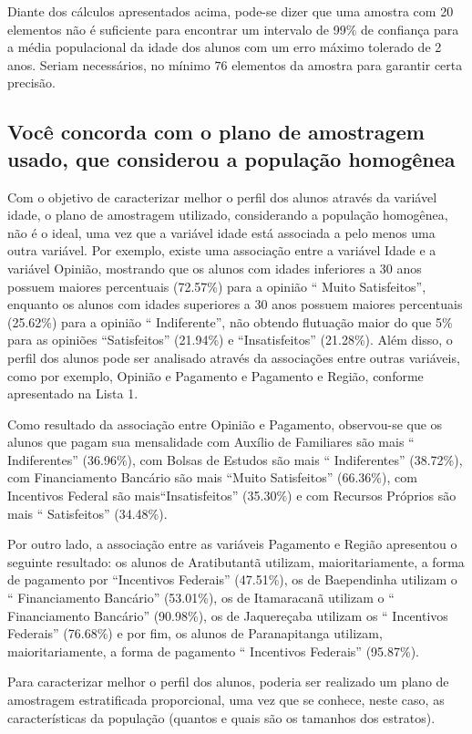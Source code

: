 	Diante dos cálculos apresentados acima, pode-se dizer que uma amostra
	com 20 elementos não é suficiente para encontrar um intervalo de 99\% de
	confiança para a média populacional da idade dos alunos com um erro
	máximo tolerado de 2 anos. Seriam necessários, no mínimo $76$ elementos da
	amostra para garantir certa precisão. 

\subsection{Você concorda com o plano de amostragem usado, que considerou a população homogênea}
	
	Com o objetivo de caracterizar melhor o perfil dos alunos através da
	variável idade, o plano de amostragem utilizado, considerando a
	população homogênea, não é o ideal, uma vez que a variável idade está
	associada a pelo menos uma outra variável. Por exemplo, existe uma
	associação entre a variável Idade e a variável Opinião, mostrando que os
	alunos com idades inferiores a 30 anos possuem maiores percentuais
	(\num{72,57}\%) para a opinião `` Muito Satisfeitos'', enquanto os 
    alunos com idades superiores
	a 30 anos possuem maiores percentuais (\num{25,62}\%) para a opinião
    `` Indiferente'', não obtendo flutuação
	maior do que 5\% para as opiniões ``Satisfeitos'' (\num{21,94}\%) 
    e ``Insatisfeitos'' (\num{21,28}\%). Além disso, o perfil dos
	alunos pode ser analisado através da associações entre outras variáveis,
	como por exemplo, Opinião e Pagamento e Pagamento e Região, conforme
	apresentado na Lista 1. 

	Como resultado da associação entre Opinião e Pagamento, observou-se que
	os alunos que pagam sua mensalidade com Auxílio de Familiares são mais
	`` Indiferentes'' (\num{36,96}\%), com Bolsas
	de Estudos são mais `` Indiferentes''
	(\num{38,72}\%), com Financiamento Bancário são mais ``Muito Satisfeitos''
    (\num{66,36}\%), com Incentivos Federal são mais``Insatisfeitos'' (\num{35,30}\%) e com
	Recursos Próprios são mais ``
	Satisfeitos'' (\num{34,48}\%).

	Por outro lado, a associação entre as variáveis Pagamento e Região
	apresentou o seguinte resultado: os alunos de Aratibutantã utilizam,
	maioritariamente, a forma de pagamento por ``Incentivos Federais''
    (\num{47,51}\%), os de Baependinha utilizam o
	`` Financiamento Bancário'' (\num{53,01}\%), os
	de Itamaracanã utilizam o `` Financiamento Bancário'' 
    (\num{90,98}\%), os de Jaquereçaba utilizam os
	`` Incentivos Federais'' (\num{76,68}\%) e por
	fim, os alunos de Paranapitanga utilizam, maioritariamente, a forma de
	pagamento `` Incentivos Federais'' (\num{95,87}\%). 

	Para caracterizar melhor o perfil dos alunos, poderia ser realizado um
	plano de amostragem estratificada proporcional, uma vez que se conhece,
	neste caso, as características da população (quantos e quais são os
	tamanhos dos estratos). 
